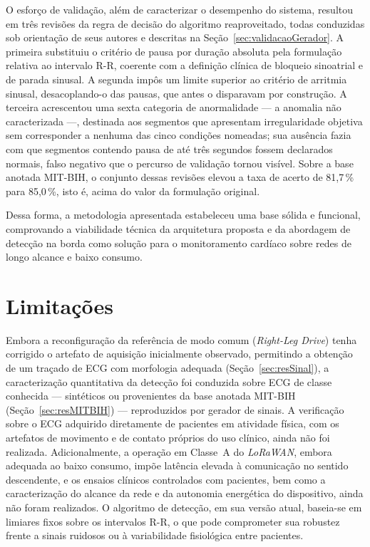 O esforço de validação, além de caracterizar o desempenho do sistema, resultou em três revisões da regra de decisão do algoritmo reaproveitado, todas conduzidas sob orientação de seus autores e descritas na Seção~\ref{sec:validacaoGerador}. A primeira substituiu o critério de pausa por duração absoluta pela formulação relativa ao intervalo R-R, coerente com a definição clínica de bloqueio sinoatrial e de parada sinusal. A segunda impôs um limite superior ao critério de arritmia sinusal, desacoplando-o das pausas, que antes o disparavam por construção. A terceira acrescentou uma sexta categoria de anormalidade --- a anomalia não caracterizada ---, destinada aos segmentos que apresentam irregularidade objetiva sem corresponder a nenhuma das cinco condições nomeadas; sua ausência fazia com que segmentos contendo pausa de até três segundos fossem declarados normais, falso negativo que o percurso de validação tornou visível. Sobre a base anotada MIT-BIH, o conjunto dessas revisões elevou a taxa de acerto de 81,7\,\% para 85,0\,\%, isto é, acima do valor da formulação original.

Dessa forma, a metodologia apresentada estabeleceu uma base sólida e funcional, comprovando a viabilidade técnica da arquitetura proposta e da abordagem de detecção na borda como solução para o monitoramento cardíaco sobre redes de longo alcance e baixo consumo.


\section{Limitações}
\label{sec:c:limitacoes}

Embora a reconfiguração da referência de modo comum (\textit{Right-Leg Drive}) tenha corrigido o artefato de aquisição inicialmente observado, permitindo a obtenção de um traçado de \acs{ECG} com morfologia adequada (Seção~\ref{sec:resSinal}), a caracterização quantitativa da detecção foi conduzida sobre \acs{ECG} de classe conhecida — sintéticos ou provenientes da base anotada MIT-BIH (Seção~\ref{sec:resMITBIH}) — reproduzidos por gerador de sinais. A verificação sobre o \acs{ECG} adquirido diretamente de pacientes em atividade física, com os artefatos de movimento e de contato próprios do uso clínico, ainda não foi realizada. Adicionalmente, a operação em Classe~A do \textit{LoRaWAN}, embora adequada ao baixo consumo, impõe latência elevada à comunicação no sentido descendente, e os ensaios clínicos controlados com pacientes, bem como a caracterização do alcance da rede e da autonomia energética do dispositivo, ainda não foram realizados. O algoritmo de detecção, em sua versão atual, baseia-se em limiares fixos sobre os intervalos R-R, o que pode comprometer sua robustez frente a sinais ruidosos ou à variabilidade fisiológica entre pacientes.


